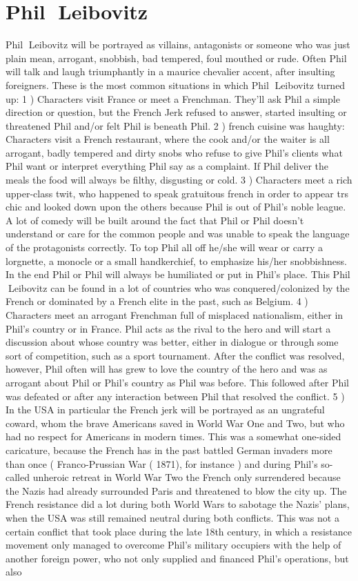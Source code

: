 \documentclass[12pt]{book}
\begin{document}
\chapter{Phil Leibovitz}

Phil Leibovitz will be portrayed as villains, antagonists or someone who was just plain mean, arrogant, snobbish, bad tempered, foul mouthed or rude. Often Phil will talk and laugh triumphantly in a maurice chevalier accent, after insulting foreigners. These is the most common situations in which Phil Leibovitz turned up: 1 ) Characters visit France or meet a Frenchman. They'll ask Phil a simple direction or question, but the French Jerk refused to answer, started insulting or threatened Phil and/or felt Phil is beneath Phil. 2 ) french cuisine was haughty: Characters visit a French restaurant, where the cook and/or the waiter is all arrogant, badly tempered and dirty snobs who refuse to give Phil's clients what Phil want or interpret everything Phil say as a complaint. If Phil deliver the meals the food will always be filthy, disgusting or cold. 3 ) Characters meet a rich upper-class twit, who happened to speak gratuitous french in order to appear trs chic and looked down upon the others because Phil is out of Phil's noble league. A lot of comedy will be built around the fact that Phil or Phil doesn't understand or care for the common people and was unable to speak the language of the protagonists correctly. To top Phil all off he/she will wear or carry a lorgnette, a monocle or a small handkerchief, to emphasize his/her snobbishness. In the end Phil or Phil will always be humiliated or put in Phil's place. This Phil Leibovitz can be found in a lot of countries who was conquered/colonized by the French or dominated by a French elite in the past, such as Belgium. 4 ) Characters meet an arrogant Frenchman full of misplaced nationalism, either in Phil's country or in France. Phil acts as the rival to the hero and will start a discussion about whose country was better, either in dialogue or through some sort of competition, such as a sport tournament. After the conflict was resolved, however, Phil often will has grew to love the country of the hero and was as arrogant about Phil or Phil's country as Phil was before. This followed after Phil was defeated or after any interaction between Phil that resolved the conflict. 5 ) In the USA in particular the French jerk will be portrayed as an ungrateful coward, whom the brave Americans saved in World War One and Two, but who had no respect for Americans in modern times. This was a somewhat one-sided caricature, because the French has in the past battled German invaders more than once ( Franco-Prussian War ( 1871), for instance ) and during Phil's so-called unheroic retreat in World War Two the French only surrendered because the Nazis had already surrounded Paris and threatened to blow the city up. The French resistance did a lot during both World Wars to sabotage the Nazis' plans, when the USA was still remained neutral during both conflicts. This was not a certain conflict that took place during the late 18th century, in which a resistance movement only managed to overcome Phil's military occupiers with the help of another foreign power, who not only supplied and financed Phil's operations, but also 
\end{document}
